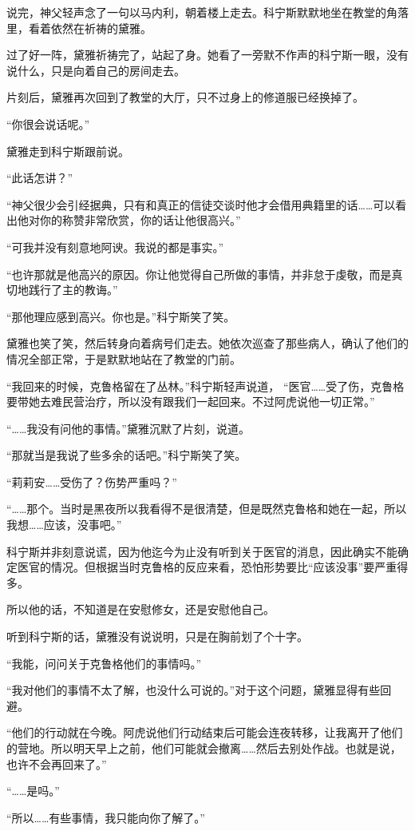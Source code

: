 说完，神父轻声念了一句以马内利，朝着楼上走去。科宁斯默默地坐在教堂的角落里，看着依然在祈祷的黛雅。

过了好一阵，黛雅祈祷完了，站起了身。她看了一旁默不作声的科宁斯一眼，没有说什么，只是向着自己的房间走去。

片刻后，黛雅再次回到了教堂的大厅，只不过身上的修道服已经换掉了。

“你很会说话呢。”

黛雅走到科宁斯跟前说。

“此话怎讲？”

“神父很少会引经据典，只有和真正的信徒交谈时他才会借用典籍里的话……可以看出他对你的称赞非常欣赏，你的话让他很高兴。”

“可我并没有刻意地阿谀。我说的都是事实。”

“也许那就是他高兴的原因。你让他觉得自己所做的事情，并非怠于虔敬，而是真切地践行了主的教诲。”

“那他理应感到高兴。你也是。”科宁斯笑了笑。

黛雅也笑了笑，然后转身向着病号们走去。她依次巡查了那些病人，确认了他们的情况全部正常，于是默默地站在了教堂的门前。

“我回来的时候，克鲁格留在了丛林。”科宁斯轻声说道， “医官……受了伤，克鲁格要带她去难民营治疗，所以没有跟我们一起回来。不过阿虎说他一切正常。”

“……我没有问他的事情。”黛雅沉默了片刻，说道。

“那就当是我说了些多余的话吧。”科宁斯笑了笑。

“莉莉安……受伤了？伤势严重吗？”

“……那个。当时是黑夜所以我看得不是很清楚，但是既然克鲁格和她在一起，所以我想……应该，没事吧。”

科宁斯并非刻意说谎，因为他迄今为止没有听到关于医官的消息，因此确实不能确定医官的情况。但根据当时克鲁格的反应来看，恐怕形势要比“应该没事”要严重得多。

所以他的话，不知道是在安慰修女，还是安慰他自己。

听到科宁斯的话，黛雅没有说说明，只是在胸前划了个十字。

“我能，问问关于克鲁格他们的事情吗。”

“我对他们的事情不太了解，也没什么可说的。”对于这个问题，黛雅显得有些回避。

“他们的行动就在今晚。阿虎说他们行动结束后可能会连夜转移，让我离开了他们的营地。所以明天早上之前，他们可能就会撤离……然后去别处作战。也就是说，也许不会再回来了。”

“……是吗。”

“所以……有些事情，我只能向你了解了。”

